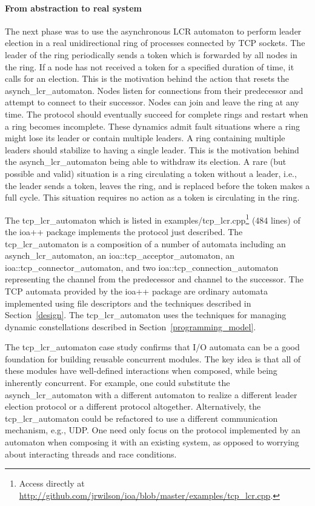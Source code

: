 \paragraph*{From abstraction to real system}
The next phase was to use the asynchronous LCR automaton to perform leader election in a real unidirectional ring of processes connected by TCP sockets.
The leader of the ring periodically sends a token which is forwarded by all nodes in the ring.
If a node has not received a token for a specified duration of time, it calls for an election.
This is the motivation behind the action that resets the asynch\_lcr\_automaton.
Nodes listen for connections from their predecessor and attempt to connect to their successor.
Nodes can join and leave the ring at any time.
The protocol should eventually succeed for complete rings and restart when a ring becomes incomplete.
These dynamics admit fault situations where a ring might lose its leader or contain multiple leaders.
A ring containing multiple leaders should stabilize to having a single leader.
This is the motivation behind the asynch\_lcr\_automaton being able to withdraw its election.
A rare (but possible and valid) situation is a ring circulating a token without a leader, i.e., the leader sends a token, leaves the ring, and is replaced before the token makes a full cycle.
This situation requires no action as a token is circulating in the ring.

The tcp\_lcr\_automaton which is listed in examples/tcp\_lcr.cpp\footnote{Access directly at \url{http://github.com/jrwilson/ioa/blob/master/examples/tcp_lcr.cpp}.} (484 lines) of the ioa++ package implements the protocol just described.
The tcp\_lcr\_automaton is a composition of a number of automata including an asynch\_lcr\_automaton, an ioa::tcp\_acceptor\_automaton, an ioa::tcp\_connector\_automaton, and two ioa::tcp\_connection\_automaton representing the channel from the predecessor and channel to the successor.
The TCP automata provided by the ioa++ package are ordinary automata implemented using file descriptors and the techniques described in Section~\ref{design}.
The tcp\_lcr\_automaton uses the techniques for managing dynamic constellations described in Section~\ref{programming_model}.

The tcp\_lcr\_automaton case study confirms that I/O automata can be a good foundation for building reusable concurrent modules.
The key idea is that all of these modules have well-defined interactions when composed, while being inherently concurrent.
For example, one could substitute the asynch\_lcr\_automaton with a different automaton to realize a different leader election protocol or a different protocol altogether.
Alternatively, the tcp\_lcr\_automaton could be refactored to use a different communication mechanism, e.g., UDP.
One need only focus on the protocol implemented by an automaton when composing it with an existing system, as opposed to worrying about interacting threads and race conditions.
\fi

